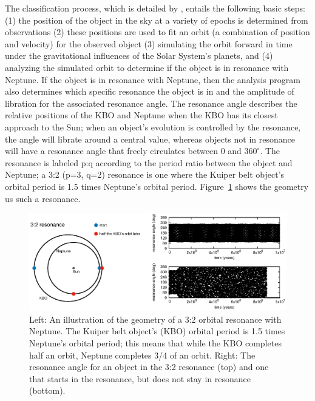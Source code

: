 \documentclass[conference]{IEEEtran}
\begin{document}
The classification process, which is detailed by \cite{Gladman2008}, entails the 
following basic steps:
(1) the position of the object in the sky at a variety of epochs is determined from observations 
(2) these positions are used to fit an orbit (a combination of position and velocity) for the observed object
(3) simulating the orbit forward in time under the gravitational influences of the Solar System's planets,
and
(4) analyzing the simulated orbit to determine if the object is
in resonance with Neptune.
If the object is in resonance with Neptune, then the analysis
program also determines which specific resonance the object is in
and the amplitude of libration for the associated resonance angle. 
The resonance angle describes the relative positions of the KBO and
Neptune when the KBO has its closest approach to the Sun; when an object's
evolution is controlled by the resonance, the angle will librate around a central
value, whereas objects not in resonance will have a resonance angle that freely
circulates between 0 and $360^{\circ}$. The resonance is labeled p:q according to the
period ratio between the object and Neptune; a 3:2 (p=3, q=2) resonance is one where 
the Kuiper belt object's orbital period is 1.5 times Neptune's orbital period. Figure~\ref{f:res-example}
shows the geometry us such a resonance.
\begin{figure} %
   \centering
   \includegraphics[width=6.2in]{multi-panel-res-figure.eps}
	\caption{Left: An illustration of the geometry of a 3:2 orbital resonance with Neptune. The Kuiper belt object's (KBO) orbital period is 1.5 times Neptune's orbital period; this means that while the KBO completes half an orbit, Neptune completes 3/4 of an orbit. Right: The resonance angle for an object in the 3:2 resonance (top) and one that starts in the resonance, but does not stay in resonance (bottom). }
   \label{f:res-example}
\end{figure}
\end{document}
